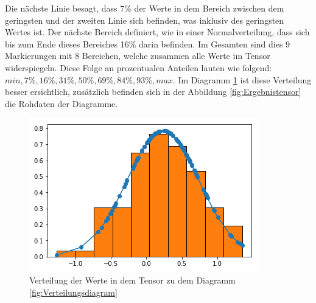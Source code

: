 Die nächste Linie besagt, dass 7\% der Werte in dem Bereich zwischen dem geringsten und der zweiten Linie sich befinden, was inklusiv des geringsten Wertes ist.  
Der nächste Bereich definiert, wie in einer Normalverteilung, dass sich bis zum Ende dieses Bereiches 16\% darin befinden. 
Im Gesamten sind dies $9$ Markierungen mit 8 Bereichen, welche zusammen alle Werte im Tensor widerspiegeln. 
Diese Folge an prozentualen Anteilen lauten wie folgend: $min, 7\%, 16\%, 31\%, 50\%, 69\%, 84\%, 93\%, max$. 
Im Diagramm \ref{fig:VerteilungsdiagrammPython} ist diese Verteilung besser ersichtlich, zusätzlich befinden sich in der Abbildung \ref{fig:Ergebnistensor} die Rohdaten der Diagramme. 
\begin{figure}
	\centering
	\includegraphics[scale=0.6]{images/gaussian.png}
	\caption{Verteilung der Werte in dem Tensor zu dem Diagramm \ref{fig:Verteilungsdiagram}}
	\label{fig:VerteilungsdiagrammPython}
\end{figure}
